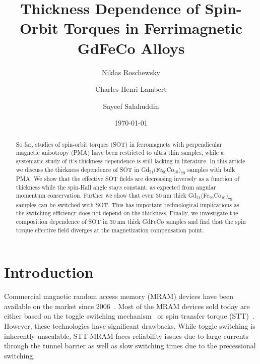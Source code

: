 \documentclass[aps,prb,superscriptaddress,sd,reprint]{revtex4-1}
\newcommand{\GdFeCo}{Gd$_{21}($Fe$_{90}$Co$_{10})_{79}$ }
\begin{document}
\title{Thickness Dependence of Spin-Orbit Torques in Ferrimagnetic GdFeCo Alloys}

\author{Niklas Roschewsky}

\author{Charles-Henri Lambert}


\author{Sayeef Salahuddin}





\date{\today}

\begin{abstract}
So far, studies of spin-orbit torques (SOT) in ferromagnets with perpendicular magnetic anisotropy (PMA) have been restricted to ultra thin samples, while a systematic study of it's thickness dependence is still lacking in literature. In this article we discuss the thickness dependence of SOT in \GdFeCo samples with bulk PMA. We show that the effective SOT fields are decreasing inversely as a function of thickness while the spin-Hall angle stays constant, as expected from angular momentum conservation. Further we show that even $\SI{30}{\nano\meter}$ thick \GdFeCo samples can be switched with SOT. This has important technological implications as the switching efficiency does not depend on the thickness. Finally, we investigate the composition dependence of SOT in $\SI{30}{\nano\meter}$ thick GdFeCo samples and find that the spin torque effective field diverges at the magnetization compensation point.
\end{abstract}

\maketitle

\section{Introduction}
Commercial magnetic random access memory (MRAM) devices have been available on the market since 2006~\cite{Apalkov2016}. Most of the MRAM devices sold today are either based on the toggle switching mechanism~\cite{Engel2005} or spin transfer torque (STT)~\cite{Rizzo2013}. However, these technologies have significant drawbacks. While toggle switching is inherently unscalable, STT-MRAM faces reliability issues due to large currents through the tunnel barrier as well as slow switching times due to the precessional switching.
\end{document}

